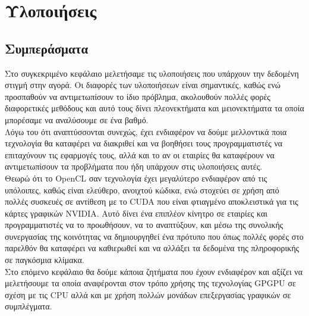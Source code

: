 \chapter{Υλοποιήσεις}




\section{Συμπεράσματα}
Στο συγκεκριμένο κεφάλαιο μελετήσαμε τις υλοποιήσεις που υπάρχουν την δεδομένη στιγμή στην αγορά. Οι διαφορές των υλοποιήσεων είναι σημαντικές, καθώς ενώ προσπαθούν να αντιμετωπίσουν το ίδιο πρόβλημα, ακολουθούν πολλές φορές διαφορετικές μεθόδους και αυτό τους δίνει πλεονεκτήματα και μειονεκτήματα τα οποία μπορέσαμε να αναλύσουμε σε ένα βαθμό.\\

Λόγω του ότι αναπτύσσονται συνεχώς, έχει ενδιαφέρον να δούμε μελλοντικά ποια τεχνολογία θα καταφέρει να διακριθεί και να βοηθήσει τους προγραμματιστές να επιταχύνουν τις εφαρμογές τους, αλλά και το αν οι εταιρίες θα καταφέρουν να αντιμετωπίσουν τα προβλήματα που ήδη υπάρχουν στις υλοποιήσεις αυτές. \\

Θεωρώ ότι το OpenCL σαν τεχνολογία έχει μεγαλύτερο ενδιαφέρον από τις υπόλοιπες, καθώς είναι ελεύθερο, ανοιχτού κώδικα, ενώ στοχεύει σε χρήση από πολλές συσκευές σε αντίθεση με το CUDA που είναι φτιαγμένο αποκλειστικά για τις κάρτες γραφικών NVIDIA. Αυτό δίνει ένα επιπλέον κίνητρο σε εταιρίες και προγραμματιστές να το προωθήσουν, να το αναπτύξουν, και μέσω της συνολικής συνεργασίας της κοινότητας να δημιουργηθεί ένα πρότυπο που όπως πολλές φορές στο παρελθόν θα καταφέρει να καθιερωθεί και να αλλάξει τα δεδομένα της πληροφορικής σε παγκόσμια κλίμακα.\\

Στο επόμενο κεφάλαιο θα δούμε κάποια ζητήματα που έχουν ενδιαφέρον και αξίζει να μελετήσουμε τα οποία αναφέρονται στον τρόπο χρήσης της τεχνολογίας GPGPU σε σχέση με τις CPU αλλά και με χρήση πολλών μονάδων επεξεργασίας γραφικών σε συμπλέγματα.